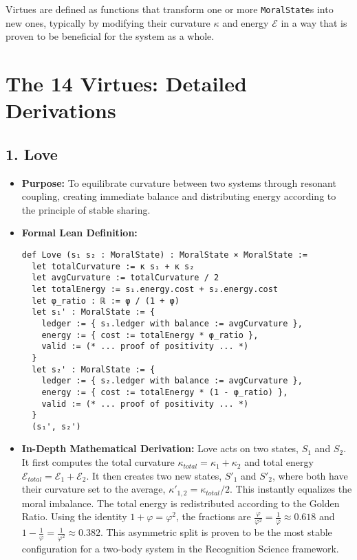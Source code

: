 \documentclass[11pt,a4paper]{article}
\begin{document}
Virtues are defined as functions that transform one or more \texttt{MoralState}s into new ones, typically by modifying their curvature $\kappa$ and energy $\mathcal{E}$ in a way that is proven to be beneficial for the system as a whole.

\section{The 14 Virtues: Detailed Derivations}

\subsection{1. Love}
\begin{itemize}
    \item \textbf{Purpose:} To equilibrate curvature between two systems through resonant coupling, creating immediate balance and distributing energy according to the principle of stable sharing.
    \item \textbf{Formal Lean Definition:}
\begin{lstlisting}
def Love (s₁ s₂ : MoralState) : MoralState × MoralState :=
  let totalCurvature := κ s₁ + κ s₂
  let avgCurvature := totalCurvature / 2
  let totalEnergy := s₁.energy.cost + s₂.energy.cost
  let φ_ratio : ℝ := φ / (1 + φ)
  let s₁' : MoralState := {
    ledger := { s₁.ledger with balance := avgCurvature },
    energy := { cost := totalEnergy * φ_ratio },
    valid := (* ... proof of positivity ... *)
  }
  let s₂' : MoralState := {
    ledger := { s₂.ledger with balance := avgCurvature },
    energy := { cost := totalEnergy * (1 - φ_ratio) },
    valid := (* ... proof of positivity ... *)
  }
  (s₁', s₂')
\end{lstlisting}
    \item \textbf{In-Depth Mathematical Derivation:}
        Love acts on two states, $S_1$ and $S_2$. It first computes the total curvature $\kappa_{total} = \kappa_1 + \kappa_2$ and total energy $\mathcal{E}_{total} = \mathcal{E}_1 + \mathcal{E}_2$. It then creates two new states, $S'_1$ and $S'_2$, where both have their curvature set to the average, $\kappa'_{1,2} = \kappa_{total}/2$. This instantly equalizes the moral imbalance.
        The total energy is redistributed according to the Golden Ratio. Using the identity $1+\varphi = \varphi^2$, the fractions are $\frac{\varphi}{\varphi^2} = \frac{1}{\varphi} \approx 0.618$ and $1 - \frac{1}{\varphi} = \frac{1}{\varphi^2} \approx 0.382$. This asymmetric split is proven to be the most stable configuration for a two-body system in the Recognition Science framework.

\end{itemize}
\end{document}
